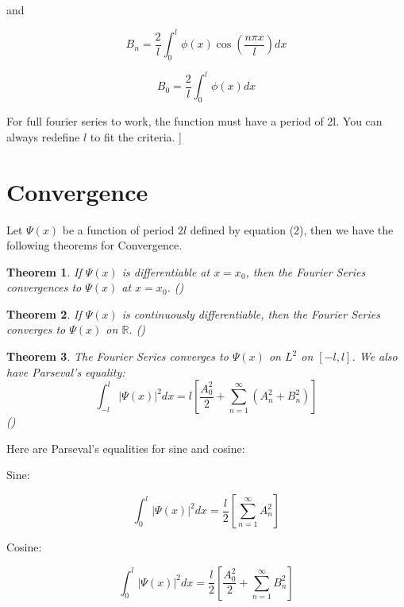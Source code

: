 \documentclass{article}
\newtheorem{theorem}{Theorem}[section]
\begin{document}
and

\begin{equation}
    B_n = \frac{2}{l}\int_{0}^{l}\phi(x)\cos(\frac{n\pi x}{l})dx
\end{equation}

\begin{equation}
    B_0 = \frac{2}{l}\int_{0}^{l}\phi(x)dx
\end{equation}

For full fourier series to work, the function must have a period of 2l. You can always redefine $l$ to fit the criteria. ]

\section*{Convergence}

Let $\Psi(x)$ be a function of period $2l$ defined by equation (2), then we have the following theorems for Convergence. 

\begin{theorem}
    If $\Psi(x)$ is differentiable at $x = x_0$, then the Fourier Series convergences to $\Psi(x)$ at $x = x_0$. ()
\end{theorem}

\begin{theorem}
    If $\Psi(x)$ is continuously differentiable, then the Fourier Series converges to $\Psi(x)$ on $\mathbb{R}$. ()
\end{theorem}

\begin{theorem}
    The Fourier Series converges to $\Psi(x)$ on $L^2$ on $[-l, l]$. We also have Parseval's equality:
    \begin{equation}
        \int_{-l}^{l}|\Psi(x)|^2dx = l[\frac{A_0^2}{2} + \sum_{n=1}^{\infty}(A_n^2 + B_n^2)]
    \end{equation}
    ()
\end{theorem}

Here are Parseval's equalities for sine and cosine:

Sine:

\begin{equation}
    \int_{0}^{l}|\Psi(x)|^2dx = \frac{l}{2}[\sum_{n=1}^{\infty}A_n^2]
\end{equation}

Cosine:

\begin{equation}
    \int_{0}^{l}|\Psi(x)|^2dx = \frac{l}{2}[\frac{A_0^2}{2} + \sum_{n=1}^{\infty}B_n^2]
\end{equation}
\end{document}

